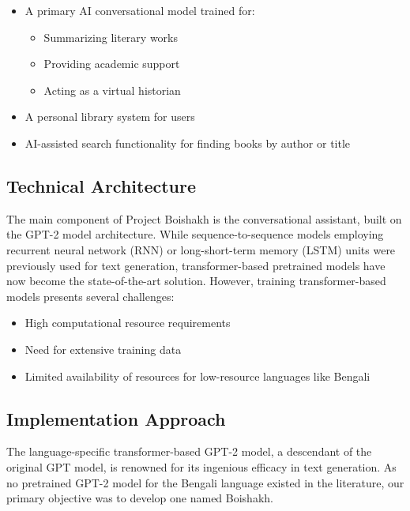 \begin{itemize}
    \item A primary AI conversational model trained for:
    \begin{itemize}
        \item Summarizing literary works
        \item Providing academic support
        \item Acting as a virtual historian
    \end{itemize}
    \item A personal library system for users
    \item AI-assisted search functionality for finding books by author or title
\end{itemize}

\subsection{Technical Architecture}
The main component of Project Boishakh is the conversational assistant, built on the GPT-2 model architecture. While sequence-to-sequence models employing recurrent neural network (RNN) or long-short-term memory (LSTM) units were previously used for text generation, transformer-based pretrained models have now become the state-of-the-art solution. However, training transformer-based models presents several challenges:

\begin{itemize}
    \item High computational resource requirements
    \item Need for extensive training data
    \item Limited availability of resources for low-resource languages like Bengali
\end{itemize}

\subsection{Implementation Approach}
The language-specific transformer-based GPT-2 model, a descendant of the original GPT model, is renowned for its ingenious efficacy in text generation. As no pretrained GPT-2 model for the Bengali language existed in the literature, our primary objective was to develop one named Boishakh.

